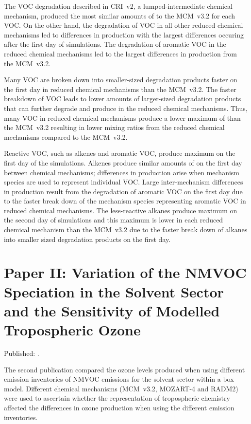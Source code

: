 The VOC degradation described in CRI~v2, a lumped-intermediate chemical mechanism, produced the most similar amounts of  to the MCM~v3.2 for each VOC.
On the other hand, the degradation of VOC in all other reduced chemical mechanisms led to differences in  production with the largest differences occuring after the first day of simulations.
The degradation of aromatic VOC in the reduced chemical mechanisms led to the largest differences in  production from the MCM~v3.2.

Many VOC are broken down into smaller-sized degradation products faster on the first day in reduced chemical mechanisms than the MCM~v3.2.
The faster breakdown of VOC leads to lower amounts of larger-sized degradation products that can further degrade and produce  in the reduced chemical mechanisms.
Thus, many VOC in reduced chemical mechanisms produce a lower maximum of  than the MCM~v3.2 resulting in lower  mixing ratios from the reduced chemical mechanisms compared to the MCM~v3.2.

Reactive VOC, such as alkenes and aromatic VOC, produce maximum  on the first day of the simulations.
Alkenes produce similar amounts of  on the first day between chemical mechanisms; differences in  production arise when mechanism species are used to represent individual VOC.
Large inter-mechanism differences in  production result from the degradation of aromatic VOC on the first day due to the faster break down of the mechanism species representing aromatic VOC in reduced chemical mechanisms.
The less-reactive alkanes produce maximum  on the second day of simulations and this maximum is lower in each reduced chemical mechanism than the MCM~v3.2 due to the faster break down of alkanes into smaller sized degradation products on the first day.

\singlespacing
\section[Paper II]{Paper II: Variation of the NMVOC Speciation in the Solvent Sector and the Sensitivity of Modelled Tropospheric Ozone} \label{s:EI_results}
\onehalfspacing

Published: .
\vspace{5mm}

The second publication compared the ozone levels produced when using different emission inventories of NMVOC emissions for the solvent sector within a box model.
Different chemical mechanisms (MCM~v3.2, MOZART-4 and RADM2) were used to ascertain whether the representation of tropospheric chemistry affected the differences in ozone production when using the different emission inventories.

